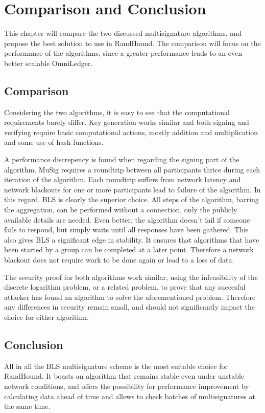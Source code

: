 \chapter{Comparison and Conclusion}
This chapter will compare the two discussed multisignature algorithms, and propose the best solution to use in RandHound. The comparison will focus on the performance of the algorithms, since a greater performance leads to an even better scalable OmniLedger.
\section{Comparison}
Considering the two algorithms, it is easy to see that the computational requirements barely differ. Key generation works similar and both signing and verifying require basic computational actions, mostly addition and multiplication and some use of hash functions.

A performance discrepency is found when regarding the signing part of the algorithm. MuSig requires a roundtrip between all participants thrice during each iteration of the algorithm. Each roundtrip suffers from network latency and network blackouts for one or more participants lead to failure of the algorithm. In this regard, BLS is clearly the superior choice. All steps of the algorithm, barring the aggregation, can be performed without a connection, only the publicly available details are needed. Even better, the algorithm doesn't fail if someone fails to respond, but simply waits until all responses have been gathered. This also gives BLS a significant edge in stability. It ensures that algorithms that have been started by a group can be completed at a later point. Therefore a network blackout does not require work to be done again or lead to a loss of data.

The security proof for both algorithms work similar, using the infeasibility of the discrete logarithm problem, or a related problem, to prove that any succesful attacker has found an algorithm to solve the aforementioned problem. Therefore any differences in security remain small, and should not significantly impact the choice for either algorithm.

\section{Conclusion}
All in all the BLS multisignature scheme is the most suitable choice for RandHound. It boasts an algorithm that remains stable even under unstable network conditions, and offers the possibility for performance improvement by calculating data ahead of time and allows to check batches of multisignatures at the same time.